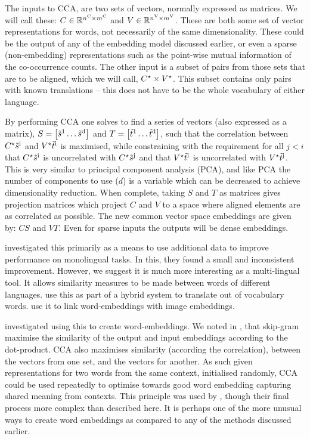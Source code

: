 \documentclass[parskip]{komatufte}
\begin{document}
The inputs to CCA, are two sets of vectors, normally expressed as matrices.
We will call these:
$C \in \mathbb{R}^{\d n_C \times \d m_C}$ and $V \in \mathbb{R}^{\d n_V \times \d m_V}$.
These are both some set of vector representations for words, not necessarily of the same dimensionality.
These could be the output of any of the embedding model discussed earlier,
or even a sparse (non-embedding) representations such as the point-wise mutual information of the co-occurrence counts.
The other input is a subset of pairs from those sets that are to be aligned, which we will call, $\d C_\star \times \d V_\star$.
This subset contains only pairs with known translations -- this does not have to be the whole vocabulary of either language.


%
By performing CCA one solves to find a series of vectors (also expressed as a matrix), $S=\left[ \dv s_1 \ldots \dv s_d \right]$ and $T= \left[ \dv t_1 \ldots \dv t_d \right]$,
such that the correlation between $\d C_\star \dv s_i$ and $\d V_\star \dv t_i$ is maximised,
while constraining with the requirement for all $j<i$ that $\d C_\star \dv s_i$ is uncorrelated with $\d C_\star \dv s_j$  and that  $ \d V_\star \dv t_i$ is uncorrelated with $\d V_\star \dv t_j$.
This is very similar to principal component analysis (PCA), and like PCA the number of components to use ($d$) is a variable which can be decreased to achieve dimensionality reduction.
When complete, taking $S$ and $T$ as matrices gives projection matrices which project $C$ and $V$ to a space where aligned elements are as correlated as possible.
The new common vector space embeddings are given by:
$C S$ and $V T$.
Even for sparse inputs the outputs will be dense embeddings.

\textcite{faruqui2014improving} investigated this primarily as a means to use additional data to improve performance on monolingual tasks.
In this, they found a small and inconsistent improvement.
However, we suggest it is much more interesting as a multi-lingual tool.
It allows similarity measures to be made between words of different languages.
 use this as part of a hybrid system to translate out of vocabulary words.
 use it to link word-embeddings with image embeddings.

 investigated using this to create word-embeddings.
We noted in , that skip-gram maximise the similarity of the output and input embeddings according to the dot-product.
CCA also maximises similarity (according the correlation), between the vectors from one set, and the vectors for another.
As such given representations for two words from the same context, initialised randomly,
CCA could be used repeatedly to optimise towards good word embedding capturing shared meaning from contexts.
This principle was used by , though their final process more complex than described here.
It is perhaps one of the more unusual ways to create word embeddings as compared to any of the methods discussed earlier.
\end{document}

